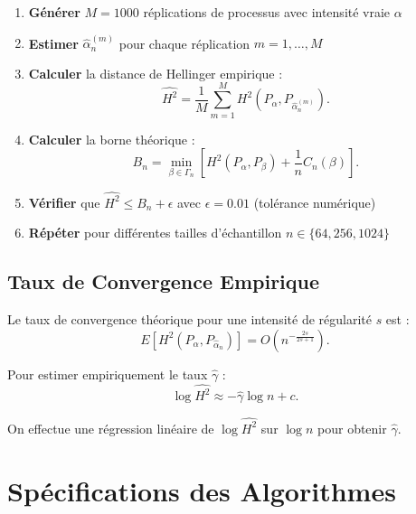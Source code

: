 \documentclass[12pt,a4paper]{article}
\begin{document}
	\begin{enumerate}
		\item \textbf{Générer} $M = 1000$ réplications de processus avec intensité vraie $\alpha$
		\item \textbf{Estimer} $\hat{\alpha}_n^{(m)}$ pour chaque réplication $m = 1, \dots, M$
		\item \textbf{Calculer} la distance de Hellinger empirique :
		\begin{equation}
			\widehat{H^2} = \frac{1}{M} \sum_{m=1}^M H^2(P_{\alpha}, P_{\hat{\alpha}_n^{(m)}}).
		\end{equation}
		\item \textbf{Calculer} la borne théorique :
		\begin{equation}
			B_n = \min_{\beta \in \Gamma_n} \left[ H^2(P_{\alpha}, P_{\beta}) + \frac{1}{n} C_n(\beta) \right].
		\end{equation}
		\item \textbf{Vérifier} que $\widehat{H^2} \leq B_n + \epsilon$ avec $\epsilon = 0.01$ (tolérance numérique)
		\item \textbf{Répéter} pour différentes tailles d'échantillon $n \in \{64, 256, 1024\}$
	\end{enumerate}
	
	\subsection{Taux de Convergence Empirique}
	\label{subsec:taux_convergence}
	
	Le taux de convergence théorique pour une intensité de régularité $s$ est :
	\begin{equation}
		E\left[ H^2(P_{\alpha}, P_{\hat{\alpha}_n}) \right] = O\left( n^{-\frac{2s}{2s+1}} \right).
	\end{equation}
	
	Pour estimer empiriquement le taux $\hat{\gamma}$ :
	\begin{equation}
		\log \widehat{H^2} \approx -\hat{\gamma} \log n + c.
	\end{equation}
	
	On effectue une régression linéaire de $\log \widehat{H^2}$ sur $\log n$ pour obtenir $\hat{\gamma}$.
	
	\section{Spécifications des Algorithmes}
	\label{sec:algorithmes}
	
\end{document}
